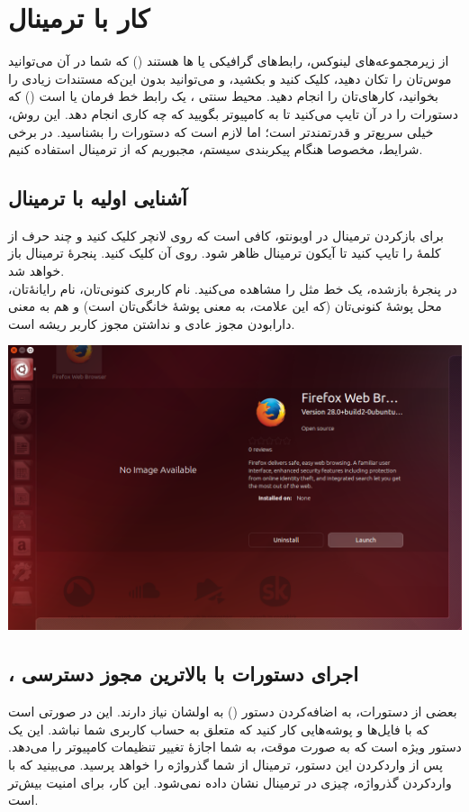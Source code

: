 \chapter{کار با ترمینال}
از زیرمجموعه‌های لینوکس، رابط‌های گرافیکی یا ها هستند () که شما در آن می‌توانید موس‌تان را تکان دهید، کلیک کنید و بکشید، و می‌توانید بدون این‌که مستندات زیادی را بخوانید، کارهای‌تان را انجام دهید. محیط سنتی ، یک رابط خط فرمان یا  است () که دستورات را در آن تایپ می‌کنید تا به کامپیوتر بگویید که چه کاری انجام دهد. این روش، خیلی سریع‌تر و قدرتمندتر است؛ اما لازم است که دستورات را بشناسید. در برخی شرایط، مخصوصا هنگام پیکربندی سیستم، مجبوریم که از ترمینال استفاده کنیم.

\section{آشنایی اولیه با ترمینال}
برای بازکردن ترمینال در اوبونتو، کافی است که روی لانچر کلیک کنید و چند حرف از کلمهٔ  را تایپ کنید تا آیکون ترمینال ظاهر شود. روی آن کلیک کنید. پنجرهٔ ترمینال باز خواهد شد.\\
در پنجرهٔ بازشده، یک خط مثل  را مشاهده می‌کنید.  نام کاربری کنونی‌تان،  نام رایانهٔ‌تان، \lr{\texttt{$\sim$}} محل پوشهٔ کنونی‌تان (که این علامت، به معنی پوشهٔ خانگی‌تان است) و \lr{\texttt{\$}} هم به معنی دارابودن مجوز عادی و نداشتن مجوز کاربر ریشه است.
\begin{center}
\includegraphics[scale=0.45]{pics/25.png}
\end{center}

\section[،sudo اجرای دستورات با بالاترین مجوز دسترسی]{، اجرای دستورات با بالاترین مجوز دسترسی}
بعضی از دستورات، به اضافه‌کردن دستور  () به اولشان نیاز دارند. این در صورتی است که با فایل‌ها و پوشه‌هایی کار کنید که متعلق به حساب کاربری شما نباشد. این یک دستور ویژه است که به صورت موقت، به شما اجازهٔ تغییر تنظیمات کامپیوتر را می‌دهد. پس از واردکردن این دستور، ترمینال از شما گذرواژه را خواهد پرسید. می‌بینید که با واردکردن گذرواژه، چیزی در ترمینال نشان داده نمی‌شود. این کار، برای امنیت بیش‌تر است.

